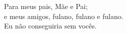 
\vspace*{\fill}

\begin{flushright}
    Para meus pais, Mãe e Pai; \\
    e meus amigos, fulano, fulano e fulano. \\
    Eu não conseguiria sem vocês. \\
\end{flushright}

\newpage